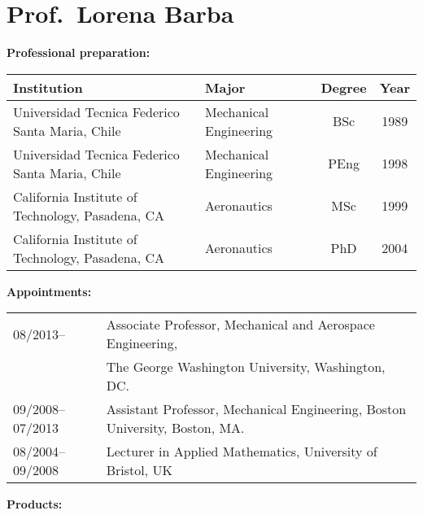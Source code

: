 \documentclass{proposalnsf}
\begin{document}
{}
\renewcommand{\thepage} {\footnotesize Barba bio-sketch\,---\,\arabic{page}}
\section*{Prof.\ Lorena Barba}

\small
\textbf{Professional preparation:} 

\begin{tabular}{llcc}
Institution & Major & Degree & Year \\ \hline
Universidad Tecnica Federico Santa Maria, Chile   &   Mechanical Engineering & BSc & 1989 \\
Universidad Tecnica Federico Santa Maria, Chile   &   Mechanical Engineering & PEng & 1998 \\
California Institute of Technology, Pasadena, CA   &   Aeronautics & MSc & 1999 \\
California Institute of Technology, Pasadena, CA  &   Aeronautics & PhD & 2004 \\
\end{tabular}


\textbf{Appointments:} 

\begin{tabular}{ll}

08/2013-- & Associate Professor, Mechanical and Aerospace Engineering,\\
& The George Washington  University, Washington, DC.\\

09/2008--07/2013 &Assistant Professor, Mechanical Engineering, Boston University, Boston, MA.\\

08/2004--09/2008 & Lecturer in Applied Mathematics, University of Bristol, UK

\end{tabular}


\textbf{Products:} %
\end{document}
